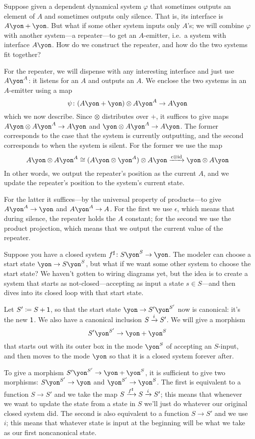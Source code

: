 \documentclass[Book-Poly]{subfiles}
\begin{document}
\begin{example}[Repeater]
Suppose given a dependent dynamical system $\varphi$ that sometimes outputs an element of $A$ and sometimes outputs only silence. That is, its interface is $A\yon+\yon$. But what if some other system inputs only $A$'s; we will combine $\varphi$ with another system---a repeater---to get an $A$-emitter, i.e.\ a system with interface $A\yon$. How do we construct the repeater, and how do the two systems fit together?

For the repeater, we will dispense with any interesting interface and just use $A\yon^A$: it listens for an $A$ and outputs an $A$. We enclose the two systems in an $A$-emitter using a map
\[\psi\colon (A\yon+\yon)\otimes A\yon^A\to A\yon\]
which we now describe. Since $\otimes$ distributes over $+$, it suffices to give maps $A\yon\otimes A\yon^A\to A\yon$ and $\yon\otimes A\yon^A\to A\yon$. The former corresponds to the case that the system is currently outputting, and the second corresponds to when the system is silent. For the former we use the map
\[
A\yon\otimes A\yon^A\cong (A\yon\otimes\yon^A)\otimes A\yon\To{\epsilon\otimes\id}\yon\otimes A\yon
\]
In other words, we output the repeater's position as the current $A$, and we update the repeater's position to the system's current state.

For the latter it suffices---by the universal property of products---to give $A\yon^A\to\yon$ and $A\yon^A\to A$. For the first we use $\epsilon$, which means that during silence, the repeater holds the $A$ constant; for the second we use the product projection, which means that we output the current value of the repeater.
\end{example}

\begin{example}
Suppose you have a closed system $f^\sharp\colon S\yon^S\to\yon$. The modeler can choose a start state $\yon\to S\yon^S$, but what if we want some other system to choose the start state? We haven't gotten to wiring diagrams yet, but the idea is to create a system that starts as not-closed---accepting as input a state $s\in S$---and then dives into its closed loop with that start state.

Let $S'\coloneqq S+\textsf{1}$, so that the start state $\yon\to S'\yon^{S'}$ now is canonical: it's the new $\textsf{1}$. We also have a canonical inclusion $S\xrightarrow{i}S'$. We will give a morphism
\[
S'\yon^{S'}\to\yon+\yon^S
\]
that starts out with its outer box in the mode $\yon^S$ of accepting an $S$-input, and then moves to the mode $\yon$ so that it is a closed system forever after.

To give a morphism $S'\yon^{S'}\to\yon+\yon^S$, it is sufficient to give two morphisms: $S\yon^{S'}\to\yon$ and $\yon^{S'}\to\yon^S$. The first is equivalent to a function $S\to S'$ and we take the map $S\xrightarrow{f^\sharp}S\xrightarrow{i}S'$; this means that whenever we want to update the state from a state in $S$ we'll just do whatever our original closed system did. The second is also equivalent to a function $S\to S'$ and we use $i$; this means that whatever state is input at the beginning will be what we take as our first noncanonical state.
\end{example}
\end{document}
